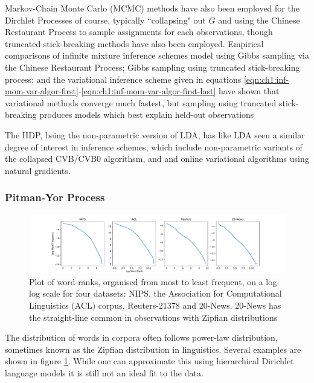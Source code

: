 Markov-Chain Monte Carlo (MCMC) methods have also been employed for the Dirchlet Processes of course, typically ``collapsing" out $G$ and using the Chinese Restaurant Process to sample assignments for each observations\cite{MacEachern1994}\cite{Escobar1995}\cite{Neal2000}, though truncated stick-breaking methods have also been employed\cite{Ishwaran2001}. Empirical comparisons of infinite mixture inference schemes model using Gibbs sampling via the Chinese Restaurant Process; Gibbs sampling using truncated stick-breaking process; and the variational inference scheme given in equations \eqref{eqn:ch1:inf-mom-var-algor-first}-\eqref{eqn:ch1:inf-mom-var-algor-first-last} have shown that variational methods converge much fastest, but sampling using truncated stick-breaking produces models which best explain held-out observations\cite{Blei2006b}


The HDP, being the non-parametric version of LDA, has like LDA seen a similar degree of interest in inference schemes, which include non-parametric variants of the collapsed CVB/CVB0 algorithsm\cite{Sato2012a}, and and online variational algorithms using natural gradients\cite{Wang2011a}.

\subsubsection{Pitman-Yor Process}
\begin{figure}
  \centering
    \hspace*{-1.5cm}\includegraphics[width=1.25\textwidth]{../Chap1/plots/zipfian_words.pdf}
  \caption{Plot of word-ranks, organised from most to least frequent, on a log-log scale for four datasets: NIPS, the Association for Computational Linguistics (ACL) corpus, Reuters-21378 and 20-News. 20-News has the straight-line common in observations with Zipfian distributions}
  \label{fig:zipfian-words}
\end{figure}
The distribution of words in corpora often follows power-law distribution, sometimes known as the Zipfian distribution in linguistics\cite{Montemurro2000}. Several examples are shown in figure \ref{fig:zipfian-words}. While one can approximate this using hierarchical Dirichlet language models\cite{MacKay1995} it is still not an ideal fit to the data.

